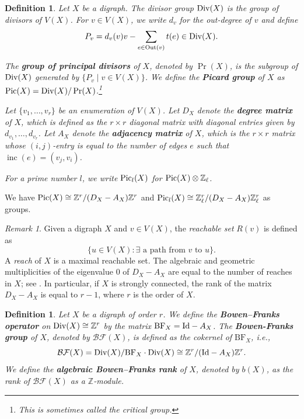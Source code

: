 \documentclass[11pt]{amsart}
\DeclareMathOperator{\inc}{inc}
\newtheorem{defn}[theorem]{Definition}
\numberwithin{equation}{section}
\theoremstyle{remark}
\newtheorem{remark}[theorem]{Remark}
\newcommand{\?}{\stackrel{?}{=}}
\newcommand{\ZZ}{\mathbb{Z}}
\newcommand{\Out}{\mathrm{Out}}
\newcommand{\Div}{\textup{Div}}
\newcommand{\BF}{\mathcal{BF}}
\newcommand{\Zl}{\ZZ_\ell}
\newcommand{\pic}{\textup{Pic}}
\begin{document}
\begin{defn}\label{def:div}
    Let $X$ be a digraph. The divisor group $\Div(X)$ is the group of divisors of $V(X)$. For $v\in V(X)$, we write $d_v$ for the out-degree of $v$ and define
    \[P_v=d_v(v)v-\sum_{e\in \Out(v)}t(e)\in \Div(X).\]
    
    The \textbf{group of principal divisors} of $X$, denoted by $\Pr(X)$, is the subgroup of $\Div(X)$ generated by $\{P_v\mid v\in V(X)\}$. We define the \textbf{Picard group} of $X$ as $\pic(X)=\Div(X)/\Pr(X)$.\footnote{This is sometimes called the critical group.} 

    Let $\{v_1,\dots, v_r\}$ be an enumeration of $V(X)$. Let $D_X$ denote the \textbf{degree matrix} of $X$, which is defined as the $r\times r$ diagonal matrix with diagonal entries given by $d_{v_1},\dots, d_{v_r}$. Let $A_X$ denote the \textbf{adjacency matrix} of $X$, which is the $r\times r$ matrix whose $(i,j)$-entry is equal to the number of edges $e$ such that $\inc(e)=(v_j,v_i)$.

For a prime number $l$, we write $\pic_l(X)$ for $\pic(X)\otimes\Zl$.
\end{defn}

We have $\pic(X)\cong \ZZ^r/(D_X-A_X)\ZZ^r$ and $\pic_l(X)\cong \Zl^r/(D_X-A_X)\Zl^r$ as groups. 

\begin{remark}\label{rank-picard} 
Given a digraph $X$ and $v\in V(X)$, the \textit{reachable set} $R(v)$ is defined as $$\{u\in V(X):\exists \text{ a path from } v \text{ to } u\}.$$
A \textit{reach} of $X$ is a maximal reachable set. The algebraic and geometric multiplicities of the eigenvalue $0$ of $D_X-A_X$ are equal to the number of reaches in $X$; see \cite[Theorem~IV.6]{VL}. In particular, if $X$ is strongly connected, the rank of the matrix $D_X-A_X$ is equal to $r-1$, where $r$ is the order of $X$.
\end{remark}
\begin{defn}\label{def:BF}
    Let $X$ be a digraph of order $r$. We define the \textbf{Bowen--Franks operator} on $\Div(X)\cong \ZZ^r$ by the matrix $\mathrm{BF}_X=\textup{Id}-A_X$. The \textbf{Bowen-Franks group} of $X$, denoted by $\BF(X)$, is defined as the cokernel of $\mathrm{BF}_X$, i.e., $$\BF(X)=\Div(X)/\mathrm{BF}_X\cdot\Div(X)\cong\ZZ^r/(\textup{Id}-A_X)\ZZ^r.$$ We define the \textbf{algebraic Bowen--Franks rank} of $X$, denoted by $b(X)$, as the rank of $\BF(X)$ as a $\ZZ$-module. 
\end{defn}
\end{document}

